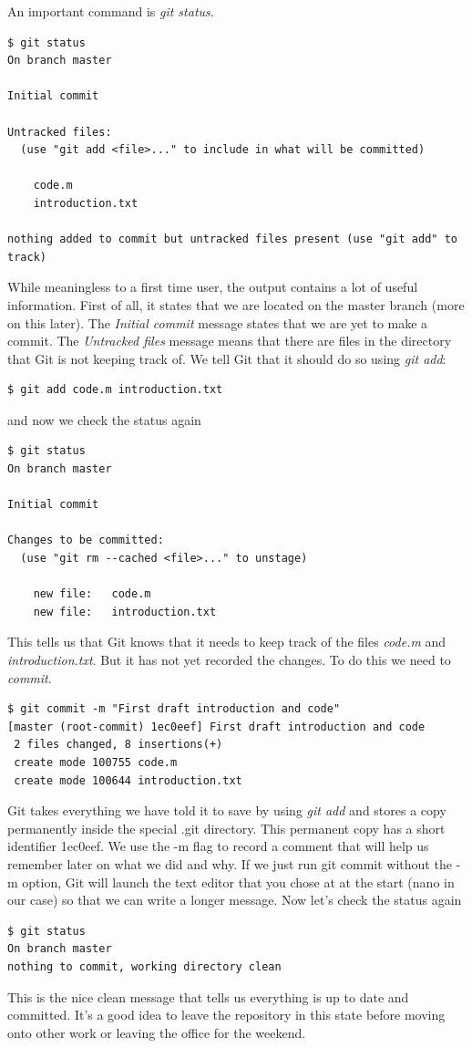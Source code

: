 \documentclass{article}
\begin{document}
An important command is \emph{git status}.
\begin{lstlisting}
$ git status
On branch master

Initial commit

Untracked files:
  (use "git add <file>..." to include in what will be committed)

	code.m
	introduction.txt

nothing added to commit but untracked files present (use "git add" to track)
\end{lstlisting}
While meaningless to a first time user, the output contains a lot of useful information. First of all, it states that we are located on the master branch (more on this later). The \emph{Initial commit} message states that we are yet to make a commit. The \emph{Untracked files} message means that there are files in the directory that Git is not keeping track of.  We tell Git that it should do so using \emph{git add}:
\begin{lstlisting}
$ git add code.m introduction.txt
\end{lstlisting}
and now we check the status again
\begin{lstlisting}
$ git status
On branch master

Initial commit

Changes to be committed:
  (use "git rm --cached <file>..." to unstage)

	new file:   code.m
	new file:   introduction.txt
\end{lstlisting}
This tells us that Git knows that it needs to keep track of the files \emph{code.m} and \emph{introduction.txt}. But it has not yet recorded the changes. To do this we need to \emph{commit}.
\begin{lstlisting}[frame=single]
$ git commit -m "First draft introduction and code"
[master (root-commit) 1ec0eef] First draft introduction and code
 2 files changed, 8 insertions(+)
 create mode 100755 code.m
 create mode 100644 introduction.txt
\end{lstlisting}
Git takes everything we have told it to save by using \emph{git add} and stores a copy permanently inside the special .git directory. This permanent copy has a short identifier 1ec0eef. We use the -m flag to record a comment that will help us remember later on what we did and why. If we just run git commit without the -m option, Git will launch the text editor that you chose at at the start (nano in our case) so that we can write a longer message. Now let's check the status again
\begin{lstlisting}[frame=single]
$ git status
On branch master
nothing to commit, working directory clean
\end{lstlisting}
This is the nice clean message that tells us everything is up to date and committed. It's a good idea to leave the repository in this state before moving onto other work or leaving the office for the weekend.\\
\end{document}
